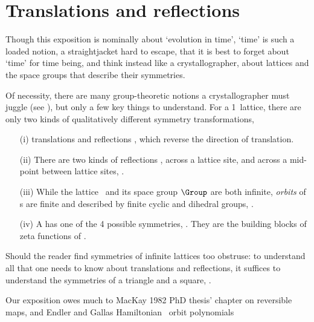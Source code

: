 

\section{Translations and reflections} %
\label{s:latt1d}
                                         \toCB

Though this exposition is nominally about `evolution in time', `time' is
such a loaded notion, a straightjacket hard to escape, that it is best to
forget about `time' for time being, and think instead like a
crystallographer, about lattices and the space groups that describe their
symmetries.

Of necessity, there are many group-theoretic notions a crystallographer must
juggle (see ), but only a few key
things to understand.
For a 1\dmn\ lattice, there are only two kinds of qualitatively different
symmetry transformations,
\begin{itemize}
  \item[(i)]
translations 
and
reflections , which reverse the direction of translation.
  \item[(ii)]
There are two kinds of reflections ,
across a lattice site,
and
across a mid-point between lattice sites, .
  \item[(iii)]
While the lattice \lattice\ and its space group $\Group$ are both
infinite, \emph{orbits} of {\lattstate}s are finite and described
by finite cyclic and dihedral groups, .
  \item[(iv)]
A {\lattstate} has one of the 4 possible symmetries,
. They are the building blocks of zeta
functions of .

\end{itemize}
Should the reader find symmetries of infinite lattices too obstruse:
to understand all that one needs to know about translations  and
reflections, it suffices to understand the symmetries of a
triangle and a square, .

Our exposition owes much to MacKay 1982 PhD thesis' chapter on
reversible maps, and Endler and Gallas Hamiltonian
\HenonMap\ orbit polynomials


